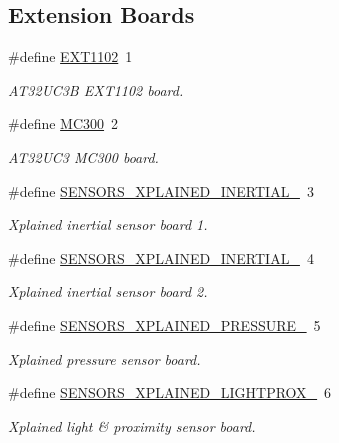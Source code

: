 \subsection*{Extension Boards}
\begin{DoxyCompactItemize}
\item 
\#define \hyperlink{group__group__common__boards_gac0e7416ec00004a707cf2d27ad58cb3d}{E\-X\-T1102}~1
\begin{DoxyCompactList}\small\item\em A\-T32\-U\-C3\-B E\-X\-T1102 board. \end{DoxyCompactList}\item 
\#define \hyperlink{group__group__common__boards_gace61944bcb2fb68401c2706a769fd03e}{M\-C300}~2
\begin{DoxyCompactList}\small\item\em A\-T32\-U\-C3 M\-C300 board. \end{DoxyCompactList}\item 
\#define \hyperlink{group__group__common__boards_gab00de293d88d2d5b7abbd20fabf3640b}{S\-E\-N\-S\-O\-R\-S\-\_\-\-X\-P\-L\-A\-I\-N\-E\-D\-\_\-\-I\-N\-E\-R\-T\-I\-A\-L\-\_}~3
\begin{DoxyCompactList}\small\item\em Xplained inertial sensor board 1. \end{DoxyCompactList}\item 
\#define \hyperlink{group__group__common__boards_gaa9549edc14a78c1600acf49e44b9c5ac}{S\-E\-N\-S\-O\-R\-S\-\_\-\-X\-P\-L\-A\-I\-N\-E\-D\-\_\-\-I\-N\-E\-R\-T\-I\-A\-L\-\_}~4
\begin{DoxyCompactList}\small\item\em Xplained inertial sensor board 2. \end{DoxyCompactList}\item 
\#define \hyperlink{group__group__common__boards_ga6d24ad0b78a00ebea03fc2b263e0735b}{S\-E\-N\-S\-O\-R\-S\-\_\-\-X\-P\-L\-A\-I\-N\-E\-D\-\_\-\-P\-R\-E\-S\-S\-U\-R\-E\-\_}~5
\begin{DoxyCompactList}\small\item\em Xplained pressure sensor board. \end{DoxyCompactList}\item 
\#define \hyperlink{group__group__common__boards_ga0a1006037bf18d016accfdea4a1105ae}{S\-E\-N\-S\-O\-R\-S\-\_\-\-X\-P\-L\-A\-I\-N\-E\-D\-\_\-\-L\-I\-G\-H\-T\-P\-R\-O\-X\-\_}~6
\begin{DoxyCompactList}\small\item\em Xplained light \& proximity sensor board. \end{DoxyCompactList}\item 

\end{DoxyCompactItemize}
